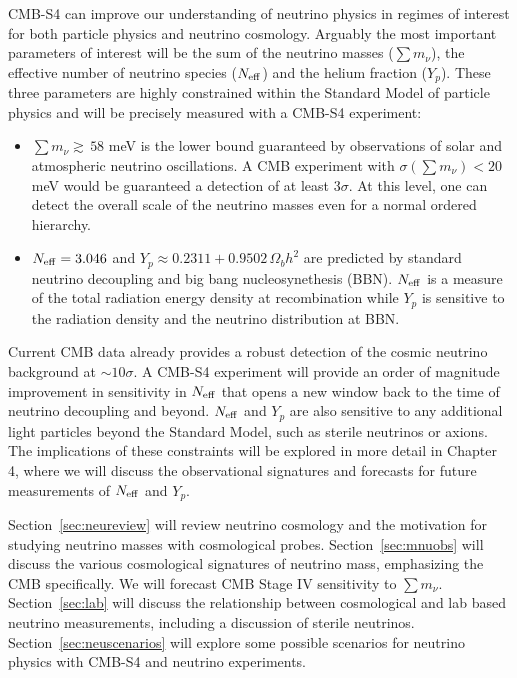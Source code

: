 CMB-S4 can improve our understanding of neutrino physics in regimes of interest for both particle physics and neutrino cosmology.  Arguably the most important parameters of interest will be the sum of the neutrino masses ($\sum m_\nu$), the effective number of neutrino species ($N_{\rm eff}$) and the helium fraction ($Y_p$).  These three parameters are highly constrained within the Standard Model of particle physics and will be precisely measured with a CMB-S4 experiment:
\begin{itemize}
\item $ \sum m_\nu \gtrsim \, 58$ meV is the lower bound guaranteed by observations of solar and atmospheric neutrino oscillations.  A CMB experiment with $\sigma(\sum m_\nu) < 20$ meV would be guaranteed a detection of at least 3$\sigma$.  At this level, one can detect the overall scale of the neutrino masses even for a normal ordered hierarchy.
\item $N_{\rm eff} =  3.046$ and $Y_p \approx 0.2311 + 0.9502 \, \Omega_b h^2$ are predicted by standard neutrino decoupling and big bang nucleosynethesis (BBN).  $N_{\rm eff}$ is a measure of the total radiation energy density at recombination while $Y_p$ is sensitive to the radiation density and the neutrino distribution at BBN. 
\end{itemize}
Current CMB data already provides a robust detection of the cosmic neutrino background at $\sim10 \sigma$.  A CMB-S4 experiment will provide an order of magnitude improvement in sensitivity in $N_{\rm eff}$ that opens a new window back to the time of neutrino decoupling and beyond.  $N_{\rm eff}$ and $Y_p$ are also sensitive to any additional light particles beyond the Standard Model, such as sterile neutrinos or axions.  The implications of these constraints will be explored in more detail in Chapter 4, where we will discuss the observational signatures and forecasts for future measurements of $N_{\rm eff}$ and $Y_p$.  

Section~\ref{sec:neureview} will review neutrino cosmology and the motivation for studying neutrino masses with cosmological probes.  Section~\ref{sec:mnuobs} will discuss the various cosmological signatures of neutrino mass, emphasizing the CMB specifically.  We will forecast CMB Stage IV sensitivity to $\sum m_\nu$.  Section~\ref{sec:lab} will discuss the relationship between cosmological and lab based neutrino measurements, including a discussion of sterile neutrinos.  Section~\ref{sec:neuscenarios} will explore some possible scenarios for neutrino physics with CMB-S4 and neutrino experiments.

